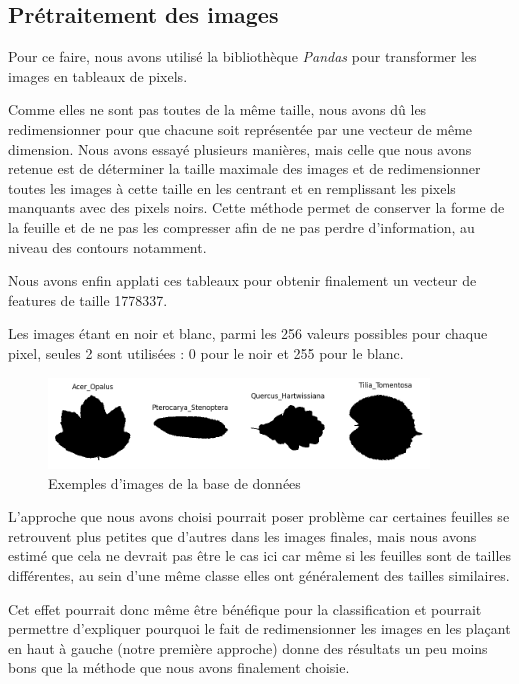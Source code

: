 \documentclass{article}
\begin{document}
\subsection{Prétraitement des images}
Pour ce faire, nous avons
utilisé la bibliothèque \textit{Pandas} \cite{pandas} pour transformer les images en
tableaux de pixels.

Comme elles ne sont pas toutes de la même taille, nous avons dû les redimensionner
pour que chacune soit représentée par une vecteur de même dimension. Nous avons
essayé plusieurs manières,
mais celle que nous avons retenue est de déterminer la taille maximale des images
et de redimensionner toutes les images à cette taille en les centrant et en remplissant
les pixels manquants avec des pixels noirs. Cette méthode permet de conserver
la forme de la feuille et de ne pas les compresser afin de ne pas perdre d'information,
au niveau des contours notamment.

Nous avons enfin applati ces tableaux pour obtenir finalement un vecteur de features de taille
1778337.

Les images étant en noir et blanc, parmi les 256 valeurs possibles pour chaque pixel,
seules 2 sont utilisées : 0 pour le noir et 255 pour le blanc.

\begin{figure}[h]
    \centering
    \includegraphics[width=0.9\textwidth]{img/img_examples.png}
    \caption{Exemples d'images de la base de données}
\end{figure}



L'approche que nous avons choisi pourrait poser problème car certaines feuilles se
retrouvent plus petites que d'autres dans les images finales, mais nous avons estimé
que cela ne devrait pas être le cas ici car même si les feuilles sont de tailles
différentes, au sein d'une même classe elles ont généralement des tailles similaires.

Cet effet pourrait donc même être bénéfique pour la classification et pourrait permettre
d'expliquer pourquoi le fait de redimensionner les images en les plaçant en haut à gauche
(notre première approche)
donne des résultats un peu moins bons que la méthode que nous avons finalement choisie.
\end{document}
